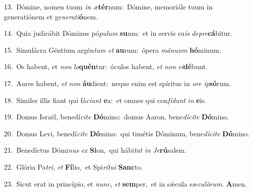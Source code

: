 {\numbfont\textcolor{\numbcolor}{13.}}~Dómine, nomen tuum \textit{in} \textit{æ}\-\textbf{tér}num:~\star Dómine, memoriále tuum in generatiónem et ge\-\textit{ne}\-\textit{ra}\textit{ti}\textbf{ó}nem.\par
{\numbfont\textcolor{\numbcolor}{14.}}~Quia judicábit Dóminus pó\-\textit{pu}\-\textit{lum} \textbf{su}\-um:~\star et in servis su\textit{is} \textit{de}\-\textit{pre}\textbf{cá}bitur.\par
{\numbfont\textcolor{\numbcolor}{15.}}~Simulácra Géntium argén\textit{tum} \textit{et} \textbf{au}\-rum:~\star ópera \textit{má}\-\textit{nu}\textit{um} \textbf{hó}\-minum.\par
{\numbfont\textcolor{\numbcolor}{16.}}~Os habent, et \textit{non} \textit{lo}\-\textbf{quén}tur:~\star óculos habent, \textit{et} \textit{non} \textit{vi}\-\textbf{dé}bunt.\par
{\numbfont\textcolor{\numbcolor}{17.}}~Aures habent, \textit{et} \textit{non} \textbf{áu}\-dient:~\star neque enim est spíritus in \textit{o}\-\textit{re} \textit{ip}\-\textbf{só}rum.\par
{\numbfont\textcolor{\numbcolor}{18.}}~Símiles illis fiant qui fá\-\textit{ci}\-\textit{unt} \textbf{e}\-a:~\star et omnes qui con\-\textit{fí}\-\textit{dunt} \textit{in} \textbf{e}\-is.\par
{\numbfont\textcolor{\numbcolor}{19.}}~Domus Israël, benedí\-\textit{ci}\-\textit{te} \textbf{Dó}\-mino:~\star domus Aaron, bene\-\textit{dí}\-\textit{ci}\textit{te} \textbf{Dó}\-mino.\par
{\numbfont\textcolor{\numbcolor}{20.}}~Domus Levi, benedí\-\textit{ci}\-\textit{te} \textbf{Dó}\-mino:~\star qui timétis Dóminum, bene\-\textit{dí}\-\textit{ci}\textit{te} \textbf{Dó}\-mino.\par
{\numbfont\textcolor{\numbcolor}{21.}}~Benedíctus Dómi\textit{nus} \textit{ex} \textbf{Si}\-on,~\star qui hábi\textit{tat} \textit{in} \textit{Je}\-\textbf{rú}salem.\par
{\numbfont\textcolor{\numbcolor}{22.}}~Glória Pa\-\textit{tri}\-, \textit{et} \textbf{Fí}\-lio,~\star et Spi\-\textit{rí}\-\textit{tu}\textit{i} \textbf{Sanc}\-to.\par
{\numbfont\textcolor{\numbcolor}{23.}}~Sicut erat in princípio, et \textit{nunc}\-, \textit{et} \textbf{sem}\-per,~\star et in sǽcula sæ\-\textit{cu}\-\textit{ló}\textit{rum}. \textbf{A}\-men.\par
